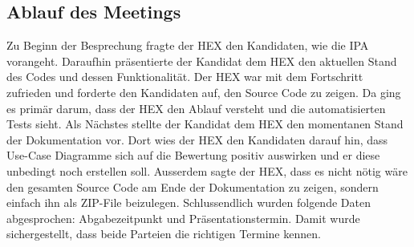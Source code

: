 \subsection{Ablauf des Meetings}
Zu Beginn der Besprechung fragte der HEX den Kandidaten, wie die IPA vorangeht. Daraufhin präsentierte der Kandidat dem HEX
den aktuellen Stand des Codes und dessen Funktionalität. Der HEX war mit dem Fortschritt zufrieden und forderte den
Kandidaten auf, den Source Code zu zeigen. Da ging es primär darum, dass der HEX den Ablauf versteht und die
automatisierten Tests sieht. \newline
Als Nächstes stellte der Kandidat dem HEX den momentanen Stand der Dokumentation vor. Dort wies der HEX den Kandidaten
darauf hin, dass Use-Case Diagramme sich auf die Bewertung positiv auswirken und er diese unbedingt noch erstellen soll.
Ausserdem sagte der HEX, dass es nicht nötig wäre den gesamten Source Code am Ende der Dokumentation zu zeigen, sondern einfach
ihn als ZIP-File beizulegen. \newline
Schlussendlich wurden folgende Daten abgesprochen: Abgabezeitpunkt und Präsentationstermin. Damit wurde sichergestellt, dass
beide Parteien die richtigen Termine kennen.
